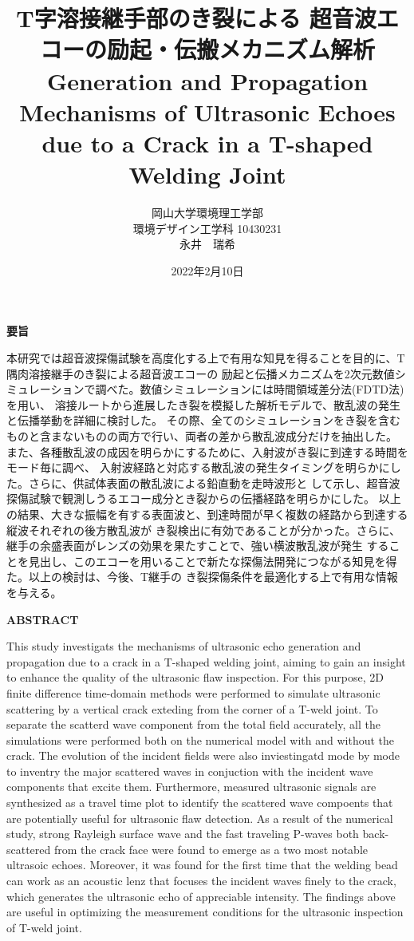 ﻿\documentclass[11pt,a4j]{mybook2}
\title{
\vspace{20mm}
T字溶接継手部のき裂による
超音波エコーの励起・伝搬メカニズム解析
\\
\vspace{5mm}
Generation and Propagation Mechanisms of Ultrasonic Echoes \\
due to a Crack in a T-shaped Welding Joint
\vspace{60mm}
}
\date{2022年2月10日}
\author{
	\vspace{40mm}
岡山大学環境理工学部\\
環境デザイン工学科 10430231\\
	永井　瑞希
}
\begin{document}
\maketitle
\begin{center}
\begin{minipage}{15cm}
\begin{center}
	{\bf 要旨}
\end{center}
本研究では超音波探傷試験を高度化する上で有用な知見を得ることを目的に、T隅肉溶接継手のき裂による超音波エコーの
励起と伝播メカニズムを2次元数値シミュレーションで調べた。数値シミュレーションには時間領域差分法(FDTD法)を用い、
溶接ルートから進展したき裂を模擬した解析モデルで、散乱波の発生と伝播挙動を詳細に検討した。
その際、全てのシミュレーションをき裂を含むものと含まないものの両方で行い、両者の差から散乱波成分だけを抽出した。
また、各種散乱波の成因を明らかにするために、入射波がき裂に到達する時間をモード毎に調べ、
入射波経路と対応する散乱波の発生タイミングを明らかにした。さらに、供試体表面の散乱波による鉛直動を走時波形と
して示し、超音波探傷試験で観測しうるエコー成分とき裂からの伝播経路を明らかにした。
以上の結果、大きな振幅を有する表面波と、到達時間が早く複数の経路から到達する縦波それぞれの後方散乱波が
き裂検出に有効であることが分かった。さらに、継手の余盛表面がレンズの効果を果たすことで、強い横波散乱波が発生
することを見出し、このエコーを用いることで新たな探傷法開発につながる知見を得た。以上の検討は、今後、T継手の
き裂探傷条件を最適化する上で有用な情報を与える。
	\vspace{15mm}
\begin{center}
	{\bf ABSTRACT}
\end{center}
This study investigats the mechanisms of ultrasonic echo generation and propagation due to 
a crack in a T-shaped welding joint, aiming to gain an insight to enhance the quality of the 
ultrasonic flaw inspection.
For this purpose, 2D finite difference time-domain methods were performed to simulate ultrasonic 
scattering by a vertical crack exteding from the corner of a T-weld joint. 
To separate the scatterd wave component from the total field accurately, all the simulations were 
performed both on the numerical model with and without the crack. The evolution of the incident 
fields were also inviestingatd mode by mode to inventry the major scattered waves in conjuction 
with the incident wave components that excite them. Furthermore, measured ultrasonic signals are 
synthesized as a travel time plot to identify the scattered wave compoents that are potentially 
useful for ultrasonic flaw detection. As a result of the numerical study, strong Rayleigh surface 
wave and the fast traveling P-waves both back-scattered from the crack face were found to 
 emerge as a two most notable ultrasoic echoes. Moreover, it was found for the first time that 
the welding bead can work as an acoustic lenz that focuses the incident waves finely to the crack, 
which  generates the ultrasonic echo of appreciable intensity.
The findings above are useful in optimizing the measurement conditions for the ultrasonic 
inspection of T-weld joint.
\end{minipage}
\end{center}
\end{document}
